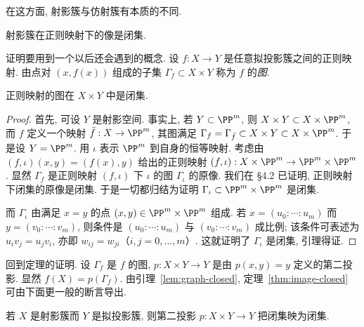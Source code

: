 在这方面, 射影簇与仿射簇有本质的不同.

\begin{theorem}\label{thm:image-closed}
	射影簇在正则映射下的像是闭集.
\end{theorem}

证明要用到一个以后还会遇到的概念. 设 $f: X \to Y$ 是任意拟投影簇之间的正则映射. 由点对 $(x, f(x))$ 组成的子集 $\Gamma_f \subset X \times Y$ 称为 $f$ 的\emph{图}.

\begin{lemma}\label{lem:graph-closed}
	正则映射的图在 $X \times Y$ 中是闭集.
\end{lemma}

\begin{proof}
	首先, 可设 $Y$ 是射影空间. 事实上, 若 $Y \subset \PP^m$, 则 $X \times Y \subset X \times \PP^m$, 而 $f$ 定义一个映射 $\bar f: X \to \PP^m$, 其图满足 $\Gamma_f = \Gamma_{\bar f} \subset X \times Y \subset X \times \PP^m$. 于是设 $Y = \PP^m$. 用 $\iota$ 表示 $\PP^m$ 到自身的恒等映射. 考虑由 $(f, \iota)(x, y) = (f(x), y)$ 给出的正则映射 $(f, \iota): X \times \PP^m \to \PP^m \times \PP^m$. 显然 $\Gamma_f$ 是正则映射 $(f, \iota)$ 下 $\iota$ 的图 $\Gamma_\iota$ 的原像. 我们在 §4.2 已证明, 正则映射下闭集的原像是闭集. 于是一切都归结为证明 $\Gamma_\iota \subset \PP^m \times \PP^m$ 是闭集.

	而 $\Gamma_\iota$ 由满足 $x = y$ 的点 $(x, y) \in \PP^m \times \PP^m$ 组成. 若 $x = (u_0 : \cdots : u_m)$ 而 $y = (v_0 : \cdots : v_m)$, 则条件是 $(u_0 : \cdots : u_m)$ 与 $(v_0 : \cdots : v_m)$ 成比例; 该条件可表述为 $u_i v_j = u_j v_i$, 亦即 $w_{ij} = w_{ji}$（$i, j = 0, \ldots, m$）. 这就证明了 $\Gamma_\iota$ 是闭集, 引理得证.
\end{proof}

回到定理的证明. 设 $\Gamma_f$ 是 $f$ 的图, $p: X \times Y \to Y$ 是由 $p(x,y) = y$ 定义的第二投影. 显然 $f(X) = p(\Gamma_f)$. 由引理~\ref{lem:graph-closed}, 定理~\ref{thm:image-closed} 可由下面更一般的断言导出.

\begin{theorem}\label{thm:projection-closed}
	若 $X$ 是射影簇而 $Y$ 是拟投影簇, 则第二投影 $p: X \times Y \to Y$ 把闭集映为闭集.
\end{theorem}

